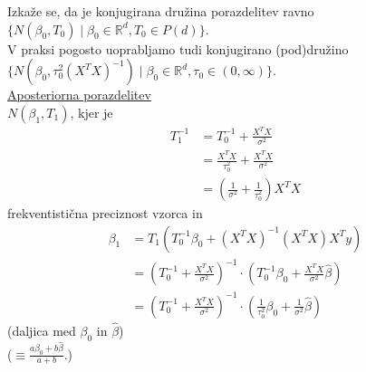 \documentclass[a4paper, 12pt]{book}
\theoremstyle{definition}
\theoremstyle{remark}
\newcommand{\R}{\mathbb{R}}
\begin{document}
Izkaže se, da je konjugirana družina porazdelitev ravno \\
$\{N(\beta_0, T_0) \mid \beta_0 \in \R^d, T_0 \in P(d)\}$. \\
V praksi pogosto uoprabljamo tudi konjugirano (pod)družino \\
$\{N\left(\beta_0, \tau_0^2 (X^T X)^{-1}\right) \mid \beta_0 \in \R^d, \tau_0 \in (0, \infty)\}$. \\
\underline{Aposteriorna porazdelitev} \\
$N(\beta_1, T_1)$, kjer je
\begin{align*}
  T_1^{-1} &= T_0^{-1} + \frac{X^T X}{\sigma^2} \\
  &= \frac{X^T X}{\tau_0^2} + \frac{X^T X}{\sigma^2} \\
  &= \left(\frac{1}{\sigma^2} + \frac{1}{\tau_0^2}\right) X^T X
\end{align*}
frekventistična preciznost vzorca in
\begin{align*}
  \beta_1 &= T_1 (T_0^{-1} \beta_0 + (X^T X)^{-1} (X^T X) X^T y) \\
  &= \left(T_0^{-1} + \frac{X^T X}{\sigma^2}\right)^{-1} \cdot
    \left(T_0^{-1} \beta_0 + \frac{X^T X}{\sigma^2} \hat{\beta}\right) \\
  &=  \left(T_0^{-1} + \frac{X^T X}{\sigma^2}\right)^{-1} \cdot
    \left(\frac{1}{\tau_0^2} \beta_0 + \frac{1}{\sigma^2} \hat{\beta}\right)
\end{align*}
(daljica med $\beta_0$ in $\hat{\beta}$) \\
($\equiv \frac{a \beta_0 + b \hat{\beta}}{a + b}$.)



%
%



\end{document}
